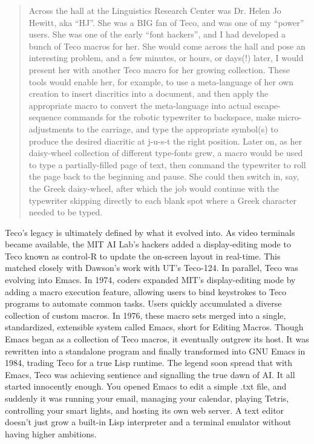 \begin{quotation}
Across the hall at the Linguistics Research Center was Dr. Helen Jo Hewitt, aka “HJ”.  She was a BIG fan of Teco, and was one of my “power” users.  She was one of the early “font hackers”, and I had developed a bunch of Teco macros for her.  She would come across the hall and pose an interesting problem, and a few minutes, or hours, or days(!) later, I would present her with another Teco macro for her growing collection. These tools would enable her, for example, to use a meta-language of her own creation to insert diacritics into a document, and then apply the appropriate macro to convert the meta-language into actual escape-sequence commands for the robotic typewriter to backspace, make micro-adjustments to the carriage, and type the appropriate symbol(s) to produce the desired diacritic at j-u-s-t the right position. Later on, as her daisy-wheel collection of different type-fonts grew, a macro would be used to type a partially-filled page of text, then command the typewriter to roll the page back to the beginning and pause. She could then switch in, say, the Greek daisy-wheel, after which the job would continue with the typewriter skipping directly to each blank spot where a Greek character needed to be typed. \cite{dawsonReUTAustin2026}
\end{quotation}

Teco's legacy is ultimately defined by what it evolved into. As video terminals became available, the MIT AI Lab’s hackers added a display-editing mode to Teco known as control-R to update the on-screen layout in real-time. This matched closely with Dawson’s work with UT’s Teco-124. In parallel, Teco was evolving into Emacs. In 1974, coders expanded MIT’s display-editing mode by adding a macro execution feature, allowing users to bind keystrokes to Teco programs to automate common tasks. Users quickly accumulated a diverse collection of custom macros. In 1976, these macro sets merged into a single, standardized, extensible system called Emacs, short for Editing Macros. Though Emacs began as a collection of Teco macros, it eventually outgrew its host. It was rewritten into a standalone program and finally transformed into GNU Emacs in 1984, trading Teco for a true Lisp runtime. The legend soon spread that with Emacs, Teco was achieving sentience and signalling the true dawn of AI. It all started innocently enough. You opened Emacs to edit a simple .txt file, and suddenly it was running your email, managing your calendar, playing Tetris, controlling your smart lights, and hosting its own web server. A text editor doesn't just grow a built-in Lisp interpreter and a terminal emulator without having higher ambitions.

